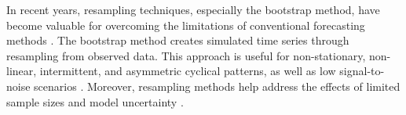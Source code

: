 \documentclass[poms,final,nonblindrev]{poms1_V1} %
\begin{document}

In recent years, resampling techniques, especially the bootstrap method, have become valuable for overcoming the limitations of conventional forecasting methods \citep{hasni2019spare}. The bootstrap method creates simulated time series through resampling from observed data. This approach is useful for non-stationary, non-linear, intermittent, and asymmetric cyclical patterns, as well as low signal-to-noise scenarios \citep{feliu2024enhancing, kreiss2012bootstrap}. Moreover, resampling methods help address the effects of limited sample sizes \citep{davison1997bootstrap}  and model uncertainty \citep{sarris2020exploiting}. 
\end{document}
